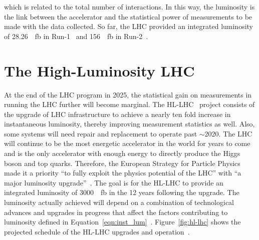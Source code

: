 which is related to the total number of interactions. In this way, the luminosity is the link between the accelerator and the statistical power of measurements to be made with the data collected. So far, the LHC provided an integrated luminosity of \SI{28.26}{\per\femto\barn} in Run-1~\cite{atlas_luminosity_run1} and \SI{156}{\per\femto\barn} in Run-2~\cite{atlas_luminosity_run2}.

\section{The High-Luminosity LHC}
At the end of the LHC program in 2025, the statistical gain on measurements in running the LHC further will become marginal. The HL-LHC~\cite{hl_lhc_tdr} project consists of the upgrade of LHC infrastructure to achieve a nearly ten fold increase in instantaneous luminosity, thereby improving measurement statistics as well. Also, some systems will need repair and replacement to operate past $\sim$2020. The LHC will continue to be the most energetic accelerator in the world for years to come and is the only accelerator with enough energy to directly produce the Higgs boson and top quarks. Therefore, the European Strategy for Particle Physics made it a priority ``to fully exploit the physics potential of the LHC'' with ``a major luminosity upgrade''~\cite{european_strategy_for_particle_physics}. The goal is for the HL-LHC to provide an integrated luminosity of \SI{3000}{\per\femto\barn} in the 12 years following the upgrade. The luminosity actually achieved will depend on a combination of technological advances and upgrades in progress that affect the factors contributing to luminosity defined in Equation~\ref{eqn:inst_lum}~\cite{hl_lhc_tdr}. Figure~\ref{fig:hl-lhc} shows the projected schedule of the HL-LHC upgrades and operation~\cite{hl-lhc_plan_picture_website}.

